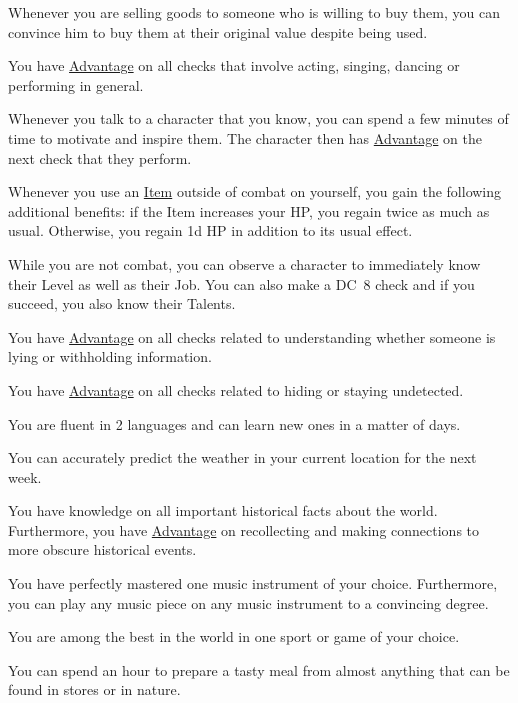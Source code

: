 \begin{description}[leftmargin=*]
{
	Whenever you are selling goods to someone who is willing to buy them, you can convince him to buy them at their original value despite being used.
}

{
	You have \hyperlink{check}{Advantage} on all checks that involve acting, singing, dancing or performing in general.
}

{
	Whenever you talk to a character that you know, you can spend a few minutes of time to motivate and inspire them.
	The character then has \hyperlink{check}{Advantage} on the next check that they perform.
}

{
	Whenever you use an \hyperlink{item}{Item} outside of combat on yourself, you gain the following additional benefits: 
	if the Item increases your HP, you regain twice as much as usual. Otherwise, you regain 1d HP in addition to its usual effect. 
}

{
	While you are not combat, you can observe a character to immediately know their Level as well as their Job.
	You can also make a DC~8 check and if you succeed, you also know their Talents.
}

\pagebreak

{
	You have \hyperlink{check}{Advantage} on all checks related to understanding whether someone is lying or withholding information.
}

{
	You have \hyperlink{check}{Advantage} on all checks related to hiding or staying undetected.
}

{
	You are fluent in 2 languages and can learn new ones in a matter of days.
}

{
	You can accurately predict the weather in your current location for the next week.
}

{
	You have knowledge on all important historical facts about the world.
	Furthermore, you have \hyperlink{check}{Advantage} on recollecting and making connections to more obscure historical events. 	 
}

{
	You have perfectly mastered one music instrument of your choice.
	Furthermore, you can play any music piece on any music instrument to a convincing degree.
}

{
	You are among the best in the world in one sport or game of your choice.
}

{
	You can spend an hour to prepare a tasty meal from almost anything that can be found in stores or in nature.
}


\end{description}
